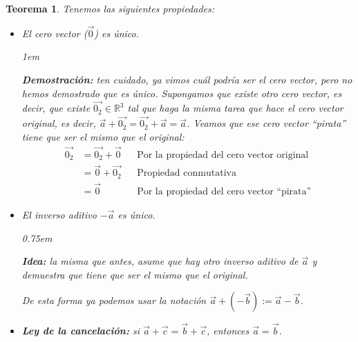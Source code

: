 \documentclass[12pt, fleqn]{report}                             %
\newenvironment{SmallIndentation}[1][0.75em]                    %
    {\begin{adjustwidth}{#1}{}\begin{footnotesize}}                 %
    {\end{footnotesize}\end{adjustwidth}}                           %
\newtheorem{Theorem}{Teorema}[section]                          %
\begin{document}
            \begin{Theorem}
            	Tenemos las siguientes propiedades:
            	\begin{itemize}\setlength\itemsep{0em}
            		\item El cero vector ($\vec{0}$) es único.
            		
            		\begin{SmallIndentation}[1em]
            			\textbf{Demostración:} ten cuidado, ya vimos cuál podría ser el cero vector, pero no hemos demostrado que es único. Supongamos que existe otro cero vector, es decir, que existe $\vec{0_2} \in \mathbb{R}^3$ tal que haga la misma tarea que hace el cero vector original, es decir, $\vec{a}+\vec{0_2}=\vec{0_2}+\vec{a}=\vec{a}$. Veamos que ese cero vector ``pirata'' tiene que ser el mismo que el original:
            			\begin{align*}
	            			\vec{0_2} &= \vec{0_2} + \vec{0} &&\mbox{Por la propiedad del cero vector original}\\
	            			&= \vec{0} + \vec{0_2} &&\mbox{Propiedad conmutativa}\\
	            			&= \vec{0} &&\mbox{Por la propiedad del cero vector ``pirata''}
            			\end{align*}
            		\end{SmallIndentation}
            		
            		\item El inverso aditivo $-\vec{a}$ es único.
            	
            		\begin{SmallIndentation}
            			\textbf{Idea:} la misma que antes, asume que hay otro inverso aditivo de $\vec{a}$ y demuestra que tiene que ser el mismo que el original.
            		\end{SmallIndentation}
            		
            		De esta forma ya podemos usar la notación $\vec{a}+\left(-\vec{b}\right) := \vec{a}-\vec{b}$.
            		
            		\item \textbf{Ley de la cancelación:} si $\vec{a}+\vec{c}=\vec{b}+\vec{c}$, entonces $\vec{a}=\vec{b}$.
            		

\end{itemize}
\end{Theorem}
\end{document}
